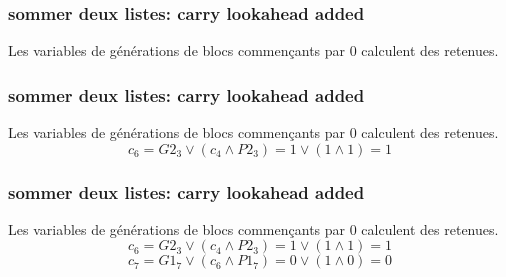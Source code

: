 \documentclass[11pt,xcolor={usenames,dvipsnames}]{beamer}
\begin{document}

\begin{frame} 
\frametitle{sommer deux listes: carry lookahead added}
  \begin{figure}
    \begin{center}
      \begin{tikzpicture}[scale = 0.7, transform shape]
      	
      \end{tikzpicture}
    \end{center}
  \end{figure}
Les variables de générations de blocs commençants par 0 calculent des retenues.
\[\quad \]
\[\quad \]
\end{frame} 


\begin{frame} 
\frametitle{sommer deux listes: carry lookahead added}
  \begin{figure}
    \begin{center}
      \begin{tikzpicture}[scale = 0.7, transform shape]
      	
      \end{tikzpicture}
    \end{center}
  \end{figure}
Les variables de générations de blocs commençants par 0 calculent des retenues.
\[c_6 = G2_3 \vee \left( c_4 \wedge P2_3\right) = 1 \vee \left( 1 \wedge 1 \right) = 1 \]
\[\quad\]
\end{frame} 


\begin{frame} 
\frametitle{sommer deux listes: carry lookahead added}
  \begin{figure}
    \begin{center}
      \begin{tikzpicture}[scale = 0.7, transform shape]
      	
      \end{tikzpicture}
    \end{center}
  \end{figure}
Les variables de générations de blocs commençants par 0 calculent des retenues.
\[c_6 = G2_3 \vee \left( c_4 \wedge P2_3\right) = 1 \vee \left( 1 \wedge 1 \right) = 1 \]
\[c_7 = G1_7 \vee \left( c_6 \wedge P1_7\right) = 0 \vee \left( 1 \wedge 0 \right) = 0 \]
\end{frame} 
\end{document}
